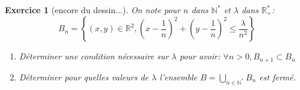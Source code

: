 \documentclass[12pt,a4paper]{article}
\newcommand{\norme}[1]{\left\lVert#1\right\rVert}
\newcommand{\R}{\mathbb{R}}
\newcommand{\N}{\mathbb{N}}
\theoremstyle{break}
\theoremstyle{break}
\newtheorem{Exo}{Exercice}
\begin{document}
%		
%		
%			
%		
%		
	
\begin{Exo}[encore du dessin...]
	 On note pour $n$ dans $\N^*$ et $\lambda$ dans $\R_+^*$:
\[
B_n=\left\{
(x,y)\in\R^2,\left(x-\frac{1}{n}\right)^2+\left(y-\frac{1}{n}\right)^2\leqslant\frac{\lambda}{n^2}
\right\}
\]
\begin{enumerate}
	\item
	Déterminer une condition nécessaire sur $\lambda$ pour avoir:
	$\forall n>0,B_{n+1}\subset B_n$
	\item
	Déterminer pour quelles valeurs de $\lambda$ l'ensemble $B=\displaystyle\bigcup_{n\in\N^*}B_n$ est fermé.
\end{enumerate}
\end{Exo}
\end{document}
